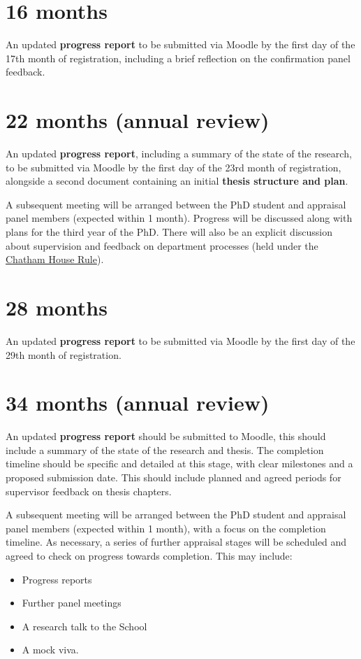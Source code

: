 \documentclass[12pt,a4paper]{article}
\begin{document}
\section{16 months}
An updated \textbf{progress report} to be submitted via Moodle by the first day of the 17th month of registration, including a brief reflection on the confirmation panel feedback.


\section{22 months (annual review)}
An updated \textbf{progress report}, including a summary of the state of the research, to be submitted via Moodle by the first day of the 23rd month of registration, alongside a second document containing an initial \textbf{thesis structure and plan}.

A subsequent meeting will be arranged between the PhD student and appraisal panel members (expected within 1 month). Progress will be discussed along with plans for the third year of the PhD. There will also be an explicit discussion about supervision and feedback on department processes (held under the \href{https://www.chathamhouse.org/chatham-house-rule}{Chatham House Rule}).


\section{28 months}
An updated \textbf{progress report} to be submitted via Moodle by the first day of the 29th month of registration.


\section{34 months (annual review)}
An updated \textbf{progress report} should be submitted to Moodle, this should include a summary of the state of the research and thesis. The completion timeline should be specific and detailed at this stage, with clear milestones and a proposed submission date. This should include planned and agreed periods for supervisor feedback on thesis chapters.

A subsequent meeting will be arranged between the PhD student and appraisal panel members (expected within 1 month), with a focus on the completion timeline. As necessary, a series of further appraisal stages will be scheduled and agreed to check on progress towards completion. This may include:
\begin{itemize}
	\item Progress reports
	\item Further panel meetings
	\item A research talk to the School
	\item A mock viva.
\end{itemize}
\end{document}
